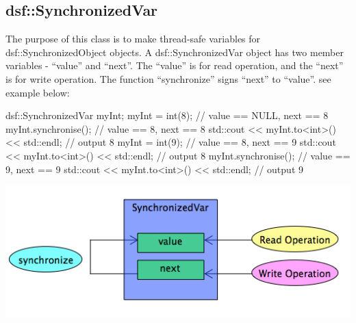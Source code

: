 \hypertarget{_framework_design_FrameworkDesignInterfacedsfSynchronizedVar}{}\subsection{dsf\+::\+Synchronized\+Var}\label{_framework_design_FrameworkDesignInterfacedsfSynchronizedVar}
The purpose of this class is to make thread-\/safe variables for dsf\+::\+Synchronized\+Object objects. A dsf\+::\+Synchronized\+Var object has two member variables -\/ “value” and “next”. The “value” is for read operation, and the “next” is for write operation. The function “synchronize” signs “next” to “value”. see example below\+: 
\begin{DoxyCode}
dsf::SynchronizedVar myInt; 
myInt = int(8); \textcolor{comment}{// value == NULL, next == 8}
myInt.synchronise(); \textcolor{comment}{// value == 8, next == 8}
std::cout << myInt.to<\textcolor{keywordtype}{int}>() << std::endl; \textcolor{comment}{// output 8}
myInt = int(9); \textcolor{comment}{// value == 8, next == 9}
std::cout << myInt.to<\textcolor{keywordtype}{int}>() << std::endl; \textcolor{comment}{// output 8}
myInt.synchronise(); \textcolor{comment}{// value == 9, next == 9}
std::cout << myInt.to<\textcolor{keywordtype}{int}>() << std::endl; \textcolor{comment}{// output 9}
\end{DoxyCode}
 
\begin{DoxyImageNoCaption}
  \mbox{\includegraphics[width=\textwidth,height=\textheight/2,keepaspectratio=true]{DesignInterfaceSynchronizedVar.png}}
\end{DoxyImageNoCaption}
 